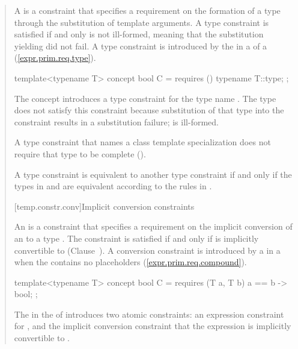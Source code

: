 \begin{quote}
\pnum
A  is a constraint that specifies a requirement 
on the formation of a type  through the substitution of template 
arguments.
% 
A type constraint is satisfied if and only  is not ill-formed, meaning 
that the substitution yielding  did not fail.
% 
\enternote
A type constraint is introduced by the  in a
 of a 
(\ref{expr.prim.req.type}).
\exitnote
% 
\enterexample
\begin{codeblock}
template<typename T> concept bool C = requires () { typename T::type; };
\end{codeblock}
The concept  introduces a type constraint for the 
type name .
% 
The type  does not satisfy this constraint
because substitution of that type into the constraint results in a
substitution failure;  is ill-formed.
\exitexample

\pnum
A type constraint that names a class template specialization 
does not require that type to be complete 
().

\pnum
A type constraint  is equivalent to another type
constraint  if and only if the types in 
and  are equivalent according to the rules in
.


[temp.constr.conv]{Implicit conversion constraints}

\pnum
An  is a constraint that 
specifies a requirement on the implicit conversion of an 
 to a type . 
% 
The constraint is satisfied if and only if  is implicitly convertible 
to  (Clause~).
% 
\enternote
A conversion constraint is introduced by a  
in a  when the 
 contains no placeholders 
(\ref{expr.prim.req.compound}).
\exitnote
% 
\enterexample
\begin{codeblock}
template<typename T> concept bool C = 
  requires (T a, T b) {
    { a == b } -> bool;
  };
\end{codeblock}
The  in the
 of  introduces two atomic 
constraints: an expression constraint for , and the implicit 
conversion constraint that the expression  is implicitly 
convertible to .
\exitexample


\end{quote}
